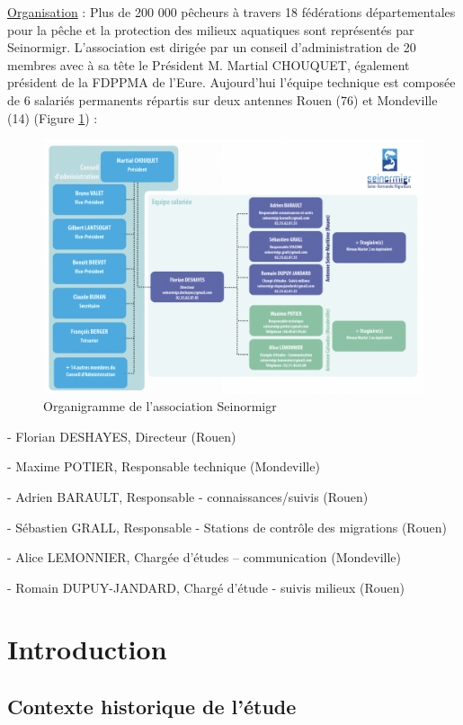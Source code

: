 \documentclass[11pt,titlepage,twoside]{article}\usepackage[]{graphicx}\usepackage[table]{xcolor}
\begin{document}
\underline{Organisation} : Plus de 200 000 pêcheurs à travers 18 fédérations départementales pour la pêche et la protection des milieux aquatiques sont représentés par Seinormigr.  L’association est dirigée par un conseil d’administration de 20 membres avec à sa tête le Président M. Martial CHOUQUET, également président de la FDPPMA de l’Eure. Aujourd’hui l’équipe technique est composée de 6 salariés permanents répartis sur deux antennes Rouen (76) et Mondeville (14) (Figure \ref{Organigramme_Seinormigr}) :

\begin{figure}[htpb]
\centering
\includegraphics[width=\textwidth]{Organigramme_Seinormigr.png}
\caption{Organigramme de l'association Seinormigr}
\label{Organigramme_Seinormigr}
\end{figure}

-	Florian DESHAYES, Directeur (Rouen)

-	Maxime POTIER, Responsable technique (Mondeville)

-	Adrien BARAULT, Responsable - connaissances/suivis (Rouen)

-	Sébastien GRALL, Responsable - Stations de contrôle des migrations (Rouen)

-	Alice LEMONNIER, Chargée d'études – communication (Mondeville)

-	Romain DUPUY-JANDARD, Chargé d'étude - suivis milieux (Rouen)

\section{Introduction}

\subsection{Contexte historique de l’étude}
\end{document}
